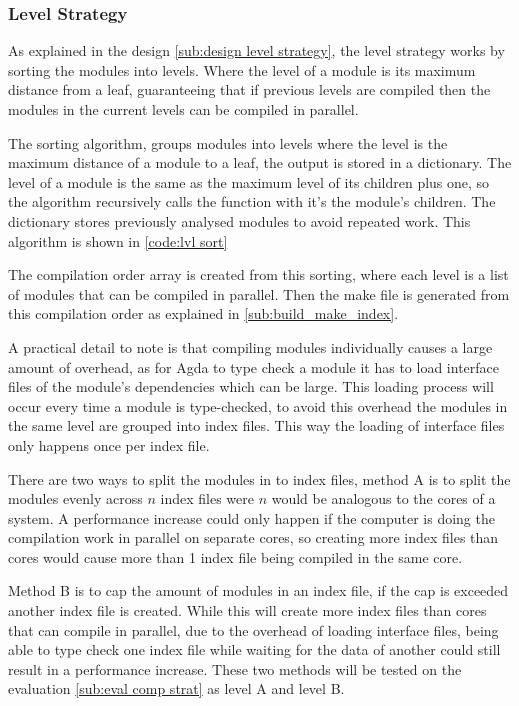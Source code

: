 \subsubsection{Level Strategy} \label{sub:imp lvl strategy}

As explained in the design \cref{sub:design level strategy}, the level
strategy works by sorting the modules into levels. Where the level of a module
is its maximum distance from a leaf, guaranteeing that if previous levels are
compiled then the modules in the current levels can be compiled in parallel.

The sorting algorithm, groups modules into levels where the level is the
maximum distance of a module to a leaf, the output is stored in a dictionary.
The level of a module is the same as the maximum level of its children plus
one, so the algorithm recursively calls the function with it's the module's
children. The dictionary stores previously analysed modules to avoid repeated
work. This algorithm is shown in \cref{code:lvl sort}

The compilation order array is created from this sorting, where each level is a
list of modules that can be compiled in parallel. Then the make file is
generated from this compilation order as explained in \cref{sub:build_make_index}.

A practical detail to note is that compiling modules individually causes a
large amount of overhead, as for Agda to type check a module it has to load
interface files of the module's dependencies which can be large. This loading
process will occur every time a module is type-checked, to avoid this overhead
the modules in the same level are grouped into index files. This way the
loading of interface files only happens once per index file.

There are two ways to split the modules in to index files, method A is to split
the modules evenly across \(n\) index files were \(n\) would be analogous to
the cores of a system. A performance increase could only happen if the computer
is doing the compilation work in parallel on separate cores, so creating more
index files than cores would cause more than 1 index file being compiled in the
same core.

Method B is to cap the amount of modules in an index file, if the cap is
exceeded another index file is created. While this will create more index files
than cores that can compile in parallel, due to the overhead of loading
interface files, being able to type check one index file while waiting for the
data of another could still result in a performance increase. These two methods
will be tested on the evaluation \cref{sub:eval comp strat} as level A
and level B.

